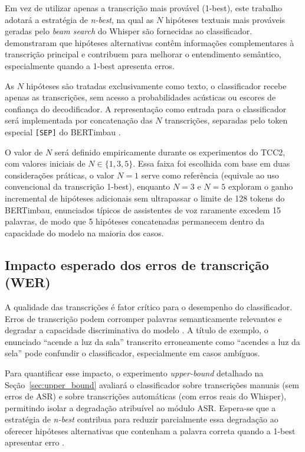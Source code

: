 \documentclass[
    12pt,                %
    openright,           %
    oneside,             %
    a4paper,             %
    english,             %
    brazil               %
]{abntex2}
\begin{document}
Em vez de utilizar apenas a transcrição mais provável (1-best), este trabalho adotará a estratégia de \textit{n-best}, na qual as $N$ hipóteses textuais mais prováveis geradas pelo \textit{beam search} do Whisper são fornecidas ao classificador.  demonstraram que hipóteses alternativas contêm informações complementares à transcrição principal e contribuem para melhorar o entendimento semântico, especialmente quando a 1-best apresenta erros.

As $N$ hipóteses são tratadas exclusivamente como texto, o classificador recebe apenas as transcrições, sem acesso a probabilidades acústicas ou escores de confiança do decodificador. A representação como entrada para o classificador será implementada por concatenação das $N$ transcrições, separadas pelo token especial \texttt{[SEP]} do BERTimbau \cite{Devlin2019, Souza2020}.

O valor de $N$ será definido empiricamente durante os experimentos do TCC2, com valores iniciais de $N \in \{1, 3, 5\}$. Essa faixa foi escolhida com base em duas considerações práticas, o valor $N = 1$ serve como referência (equivale ao uso convencional da transcrição 1-best), enquanto $N = 3$ e $N = 5$ exploram o ganho incremental de hipóteses adicionais sem ultrapassar o limite de 128 tokens do BERTimbau, enunciados típicos de assistentes de voz raramente excedem 15 palavras, de modo que 5 hipóteses concatenadas permanecem dentro da capacidade do modelo na maioria dos casos.

\subsection{Impacto esperado dos erros de transcrição (WER)}
\label{sec:wer_impacto}

A qualidade das transcrições é fator crítico para o desempenho do classificador. Erros de transcrição podem corromper palavras semanticamente relevantes e degradar a capacidade discriminativa do modelo \cite{Dighe2024}. A título de exemplo, o enunciado ``acende a luz da sala'' transcrito erroneamente como ``acendes a luz da sela'' pode confundir o classificador, especialmente em casos ambíguos.

Para quantificar esse impacto, o experimento \textit{upper-bound} detalhado na Seção~\ref{sec:upper_bound} avaliará o classificador sobre transcrições manuais (sem erros de ASR) e sobre transcrições automáticas (com erros reais do Whisper), permitindo isolar a degradação atribuível ao módulo ASR. Espera-se que a estratégia de \textit{n-best} contribua para reduzir parcialmente essa degradação ao oferecer hipóteses alternativas que contenham a palavra correta quando a 1-best apresentar erro \cite{Dighe2024}.
\end{document}
